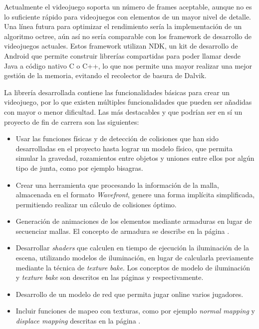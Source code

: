 Actualmente el videojuego soporta un número de frames aceptable, aunque no es lo suficiente rápido para videojuegos con elementos de un mayor nivel de detalle. Una línea futura para optimizar el rendimiento sería la implementación de un algoritmo octree, aún así no sería comparable con los framework de desarrollo de videojuegos actuales. Estos framework utilizan NDK, un kit de desarrollo de Android que permite construir librerías compartidas para poder llamar desde Java a código nativo C o C++, lo que nos permite una mayor realizar una mejor gestión de la memoria, evitando el recolector de basura de Dalvik. 
\newline

La librería desarrollada contiene las funcionalidades básicas para crear un videojuego, por lo que existen múltiples funcionalidades que pueden ser añadidas con mayor o menor dificultad. Las más destacables y que podrían ser en sí un proyecto de fin de carrera son las siguientes:
\begin{itemize}
\item Usar las funciones físicas y de detección de colisiones que han sido desarrolladas en el proyecto hasta lograr un modelo físico, que permita simular la gravedad, rozamientos entre objetos y uniones entre ellos por algún tipo de junta, como por ejemplo bisagras.
\item Crear una herramienta que procesando la información de la malla, almacenada en el formato \emph{Wavefront}, genere una forma implícita simplificada, permitiendo realizar un cálculo de colisiones óptimo. 
\item Generación de animaciones de los elementos mediante armaduras en lugar de secuenciar mallas. El concepto de armadura se describe en la página \pageref{sec:armadura}.
\item Desarrollar \emph{shaders} que calculen en tiempo de ejecución la iluminación de la escena, utilizando modelos de iluminación, en lugar de calcularla previamente mediante la técnica de \emph{texture bake}. Los conceptos de modelo de iluminación y \emph{texture bake} son descritos en las páginas \pageref{modeloIluminacion} y \pageref{textureBake} respectivamente.
\item Desarrollo de un modelo de red que permita jugar online varios jugadores.
\item Incluir funciones de mapeo con texturas, como por ejemplo \emph{normal mapping} y \emph{displace mapping} descritas en la página \pageref{funcionesMapeo}.
\end{itemize}
